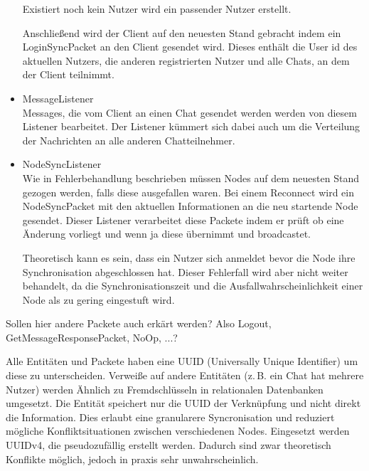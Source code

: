 \begin{itemize}
            
            Existiert noch kein Nutzer wird ein passender Nutzer erstellt.
            
            Anschließend wird der Client auf den neuesten Stand gebracht indem ein LoginSyncPacket an den Client gesendet wird. Dieses enthält die User id des aktuellen Nutzers, die anderen registrierten Nutzer und alle Chats, an dem der Client teilnimmt.
            
        \item MessageListener\\
            Messages, die vom Client an einen Chat gesendet werden werden von diesem Listener bearbeitet. Der Listener kümmert sich dabei auch um die Verteilung der Nachrichten an alle anderen Chatteilnehmer.
            
        \item NodeSyncListener\\
            Wie in Fehlerbehandlung beschrieben müssen Nodes auf dem neuesten Stand gezogen werden, falls diese ausgefallen waren. Bei einem Reconnect wird ein NodeSyncPacket mit den aktuellen Informationen an die neu startende Node gesendet. Dieser Listener verarbeitet diese Packete indem er prüft ob eine Änderung vorliegt und wenn ja diese übernimmt und broadcastet. 
            
            Theoretisch kann es sein, dass ein Nutzer sich anmeldet bevor die Node ihre Synchronisation abgeschlossen hat. Dieser Fehlerfall wird aber nicht weiter behandelt, da die Synchronisationszeit und die Ausfallwahrscheinlichkeit einer Node als zu gering eingestuft wird.
    \end{itemize}


    Sollen hier andere Packete auch erkärt werden? Also Logout, GetMessageResponsePacket, NoOp, ...?



Alle Entitäten und Packete haben eine UUID (Universally Unique Identifier) um diese zu unterscheiden. Verweiße auf andere Entitäten (z.\,B. ein Chat hat mehrere Nutzer) werden Ähnlich zu Fremdschlüsseln in relationalen Datenbanken umgesetzt. Die Entität speichert nur die UUID der Verknüpfung und nicht direkt die Information. Dies erlaubt eine granularere Syncronisation und reduziert mögliche Konfliktsituationen zwischen verschiedenen Nodes. Eingesetzt werden UUIDv4, die pseudozufällig erstellt werden. Dadurch sind zwar theoretisch Konflikte möglich, jedoch in praxis sehr unwahrscheinlich.

